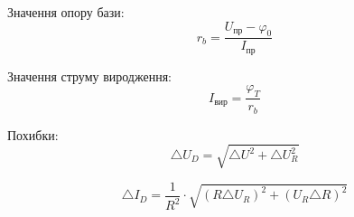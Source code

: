\documentclass[14pt,a4paper]{scrartcl}
\begin{document}
Значення опору бази:
\begin{equation}
r_b = \dfrac{U_{\text{пр}} - \varphi_0}{I_{\text{пр}}} 
\end{equation}

Значення струму виродження:
\begin{equation}
I_{\text{вир}} = \dfrac{\varphi_T}{r_b}
\end{equation}

Похибки:
\begin{equation}
\triangle U_D = \sqrt{\triangle U^2 +\triangle U_R^2 }
\label{eq:ref}
\end{equation}

\begin{equation}
\triangle I_D = \dfrac 1{R^2} \cdot \sqrt {(R\triangle U_R)^2 + (U_R\triangle R)^2}
\label{eq:ref}
\end{equation}
\end{document}

